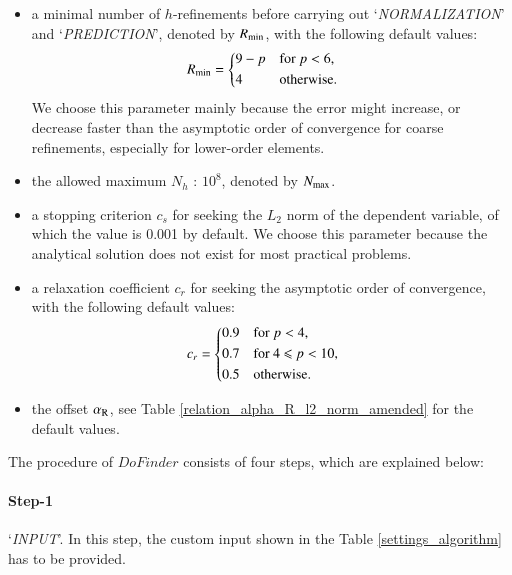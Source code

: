 \documentclass[review,3p]{elsarticle}
\begin{document}
\begin{itemize}
  \renewcommand\labelitemi{--}
  \item a minimal number of $h$-refinements before carrying out `\textit{NORMALIZATION}' and `\textit{PREDICTION}', denoted by $R_{\rm min}$, with the following default values:
  \begin{equation}
  \begin{aligned}
      R_{\rm min} &=
      \begin{cases*}
	9-p & for $p < 6$, \\
	4 & otherwise.
      \end{cases*}
  \end{aligned}
  \end{equation}
  We choose this parameter mainly because the error might increase, or decrease faster than the asymptotic order of convergence for coarse refinements, especially for lower-order elements.
  \item the allowed maximum $N_h$ : $10^8$, denoted by $N_{\rm max}$.  
  \item a stopping criterion $c_s$ for seeking the $L_2$ norm of the dependent variable, of which the value is 0.001 by default. We choose this parameter because the analytical solution does not exist for most practical problems.
  \item a relaxation coefficient $c_r$ for seeking the asymptotic order of convergence, with the following default values: 
    \begin{equation}
    \begin{aligned}
	c_r &=
	\begin{cases*}
	  0.9 & for $p<4$, \\
	  0.7 & for 4 $\leqslant$ $p < 10$, \\
	  0.5 & otherwise.
	\end{cases*}
    \end{aligned}
    \end{equation}
  \item the offset $\alpha _{\rm R}$, see Table \ref{relation_alpha_R_l2_norm_amended} for the default values.
\end{itemize}

The procedure of $DoFinder$ consists of four steps, which are explained below:

\paragraph{Step-1} `\textit{INPUT}'. In this step, the custom input shown in the Table \ref{settings_algorithm} has to be provided.
\end{document}
